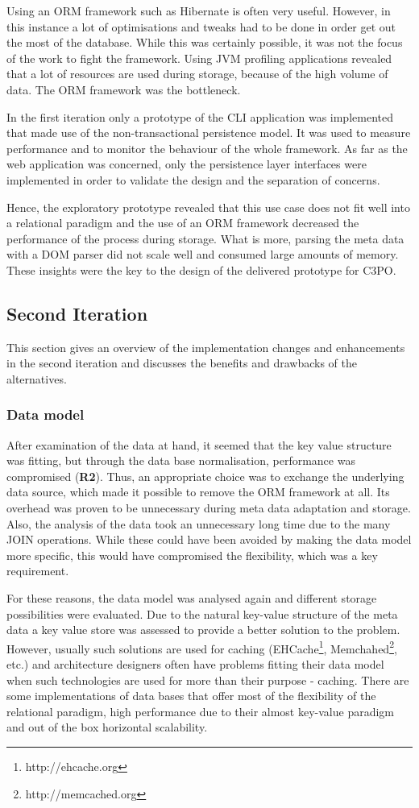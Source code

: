 Using an ORM framework such as Hibernate is often very useful. However, in this instance a lot of optimisations and tweaks had to be done in order get out the most of the database. While this was certainly possible, it was not the focus of the work to fight the framework. Using JVM profiling applications revealed that a lot of resources are used during storage, because of the high volume of data. The ORM framework was the bottleneck.

In the first iteration only a prototype of the CLI application was implemented that made use of the non-transactional persistence model. It was used to measure performance and to monitor the behaviour of the whole framework. As far as the web application was concerned, only the persistence layer interfaces were implemented in order to validate the design and the separation of concerns.

Hence, the exploratory prototype revealed that this use case does not fit well into a relational paradigm and the use of an ORM framework decreased the performance of the process during storage. What is more, parsing the meta data with a DOM parser did not scale well and consumed large amounts of memory. These insights were the key to the design of the delivered prototype for C3PO.

\subsection{Second Iteration}
This section gives an overview of the implementation changes and enhancements in the second iteration and discusses the benefits and drawbacks of the alternatives.

\subsubsection{Data model}
After examination of the data at hand, it seemed that the key value structure was fitting, but through the data base normalisation, performance was compromised (\textbf{R2}). Thus, an appropriate choice was to exchange the underlying data source, which made it possible to remove the ORM framework at all. Its overhead was proven to be unnecessary during meta data adaptation and storage. Also, the analysis of the data took an unnecessary long time due to the many JOIN operations. While these could have been avoided by making the data model more specific, this would have compromised the flexibility, which was a key requirement.

For these reasons, the data model was analysed again and different storage possibilities were evaluated.  Due to the natural key-value structure of the meta data a key value store was assessed to provide a better solution to the problem. However, usually such solutions are used for caching (EHCache\footnote{http://ehcache.org}, Memchahed\footnote{http://memcached.org}, etc.) and architecture designers often have problems fitting their data model when such technologies are used for more than their purpose - caching. There are some implementations of data bases that offer most of the flexibility of the relational paradigm, high performance due to their almost key-value paradigm and out of the box horizontal scalability.

